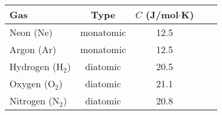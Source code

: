 \begin{tabular}{lcccc}
\hline\hline
Gas & Type & $C$ (J/mol$\cdot$K) \\ \hline
\noalign{\smallskip}
Neon (Ne) & monatomic & 12.5 \\
Argon (Ar) & monatomic & 12.5 \\
Hydrogen (H$_2$) & diatomic & 20.5 \\
Oxygen (O$_2$) & diatomic & 21.1 \\
Nitrogen (N$_2$) & diatomic & 20.8 \\
\hline\hline
\end{tabular}

